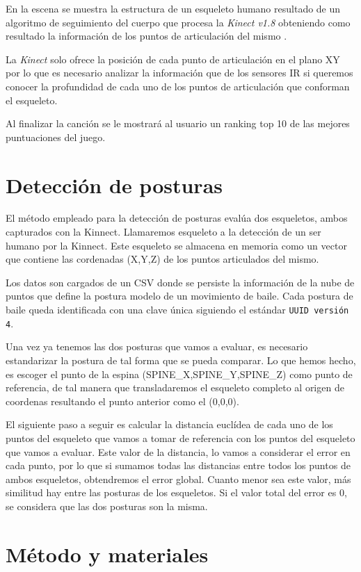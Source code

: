 \documentclass[10pt,a4paper]{report}
\begin{document}
	En la escena se muestra la estructura de un esqueleto humano resultado de un algoritmo de seguimiento del cuerpo que procesa la \textit{Kinect v1.8} obteniendo como resultado la información de los puntos de articulación del mismo \cite{control.kinect-controller}.
	
	La \textit{Kinect} solo ofrece la posición de cada punto de articulación en el plano XY por lo que es necesario analizar la información que de los sensores IR si queremos conocer la profundidad de cada uno de los puntos de articulación que conforman el esqueleto.
	
	Al finalizar la canción se le mostrará al usuario un ranking top 10 de las mejores puntuaciones del juego.
	
	\chapter{Detección de posturas}
	El método empleado para la detección de posturas evalúa dos esqueletos, ambos capturados con la Kinnect. Llamaremos esqueleto a la detección de un ser humano por la Kinnect. Este esqueleto se almacena en memoria como un vector que contiene las cordenadas (X,Y,Z) de los puntos articulados del mismo. 
		
	Los datos son cargados de un CSV donde se persiste la información de la nube de puntos que define la postura modelo de un movimiento de baile. Cada postura de baile queda identificada con una clave única siguiendo el estándar \texttt{UUID versión 4}.
	
	Una vez ya tenemos las dos posturas que vamos a evaluar, es necesario estandarizar la postura de tal forma que se pueda comparar. Lo que hemos hecho, es escoger el punto de la espina (SPINE\_X,SPINE\_Y,SPINE\_Z) como punto de referencia, de tal manera que transladaremos el esqueleto completo al origen de coordenas resultando el punto anterior como el (0,0,0).

El siguiente paso a seguir es calcular la distancia euclídea de cada uno de los puntos del esqueleto que vamos a tomar de referencia con los puntos del esqueleto que vamos a evaluar. Este valor de la distancia, lo vamos a considerar el error en cada punto, por lo que si sumamos todas las distancias entre todos los puntos de ambos esqueletos, obtendremos el error global. Cuanto menor sea este valor, más similitud hay entre las posturas de los esqueletos. Si el valor total del error es 0, se considera que las dos posturas son la misma.
	
	\chapter{Método y materiales}
\end{document}
